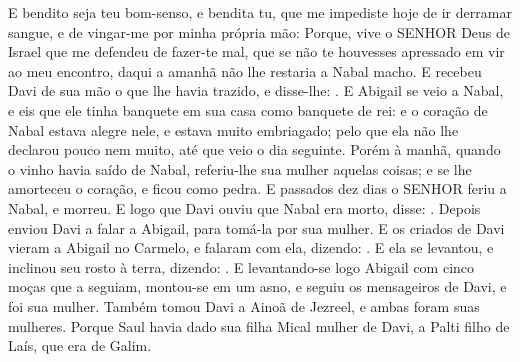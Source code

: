 {{  E bendito seja teu bom-senso, e bendita tu, que me impediste hoje de ir derramar sangue, e de vingar-me por minha própria mão:
  Porque, vive o SENHOR Deus de Israel que me defendeu de fazer-te mal, que se não te houvesses apressado em vir ao meu encontro, daqui a amanhã não lhe restaria a Nabal macho}.
  E recebeu Davi de sua mão o que lhe havia trazido, e disse-lhe: .
  E Abigail se veio a Nabal, e eis que ele tinha banquete em sua casa como banquete de rei: e o coração de Nabal estava alegre nele, e estava muito embriagado; pelo que ela não lhe declarou pouco nem muito, até que veio o dia seguinte.
  Porém à manhã, quando o vinho havia saído de Nabal, referiu-lhe sua mulher aquelas coisas; e se lhe amorteceu o coração, e ficou como pedra.
  E passados dez dias o SENHOR feriu a Nabal, e morreu.
  E logo que Davi ouviu que Nabal era morto, disse: . Depois enviou Davi a falar a Abigail, para tomá-la por sua mulher.
  E os criados de Davi vieram a Abigail no Carmelo, e falaram com ela, dizendo: .
  E ela se levantou, e inclinou seu rosto à terra, dizendo: . %
  E levantando-se logo Abigail com cinco moças que a seguiam, montou-se em um asno, e seguiu os mensageiros de Davi, e foi sua mulher.
  Também tomou Davi a Ainoã de Jezreel, e ambas foram suas mulheres.
  Porque Saul havia dado sua filha Mical mulher de Davi, a Palti filho de Laís, que era de Galim.
\par }


